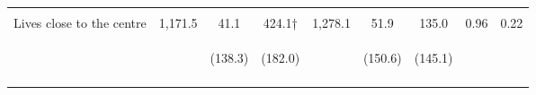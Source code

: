 \begin{tabular}{lcccccccc}
 & \begin{footnotesize}\end{footnotesize} & \begin{footnotesize}[1.000]\end{footnotesize} & \begin{footnotesize}[0.027]\end{footnotesize} & \begin{footnotesize}\end{footnotesize} & \begin{footnotesize}[1.000]\end{footnotesize} & \begin{footnotesize}[0.527]\end{footnotesize} & \begin{footnotesize}\end{footnotesize} & \begin{footnotesize}\end{footnotesize}\\
\noalign{\smallskip}Lives close to the centre & 1,171.5 & 41.1 & 424.1† & 1,278.1 & 51.9 & 135.0 & 0.96 & 0.22\\
 & \begin{footnotesize}\end{footnotesize} & \begin{footnotesize}(138.3)\end{footnotesize} & \begin{footnotesize}(182.0)\end{footnotesize} & \begin{footnotesize}\end{footnotesize} & \begin{footnotesize}(150.6)\end{footnotesize} & \begin{footnotesize}(145.1)\end{footnotesize} & \begin{footnotesize}\end{footnotesize} & \begin{footnotesize}\end{footnotesize}\\
 & \begin{footnotesize}\end{footnotesize} & \begin{footnotesize}[1.000]\end{footnotesize} & \begin{footnotesize}[0.036]\end{footnotesize} & \begin{footnotesize}\end{footnotesize} & \begin{footnotesize}[1.000]\end{footnotesize} & \begin{footnotesize}[0.527]\end{footnotesize} & \begin{footnotesize}\end{footnotesize} & \begin{footnotesize}\end{footnotesize}\\

\end{tabular}
